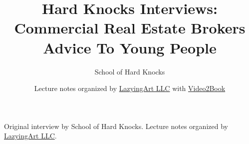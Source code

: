 \documentclass[11pt,oneside]{book}
\begin{document}
\frontmatter
\title{Hard Knocks Interviews: Commercial Real Estate Brokers Advice To Young People}
\author{School of Hard Knocks}
\date{Lecture notes organized by \href{https://lazying.art}{LazyingArt LLC} with \href{https://github.com/lachlanchen/Video2Book}{Video2Book}}
\maketitle
\begin{center}
\small Original interview by School of Hard Knocks. Lecture notes organized by \href{https://lazying.art}{LazyingArt LLC}.
\end{center}
\clearpage
\mainmatter

\end{document}
